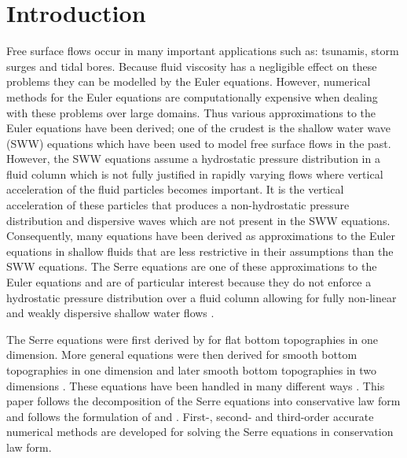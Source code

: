 \documentclass[SingleSpace,12pt,Proceedings]{Serre_ASCE}
\begin{document}
\section{Introduction} \label{intro}
Free surface flows occur in many important applications such as: tsunamis, storm surges and tidal bores. Because fluid viscosity has a negligible effect on these problems they can be modelled by the Euler equations. However, numerical methods for the Euler equations are computationally expensive when dealing with these problems over large domains. Thus various approximations to the Euler equations have been derived; one of the crudest is the shallow water wave (SWW) equations which have been used to model free surface flows in the past. However, the SWW equations assume a hydrostatic pressure distribution in a fluid column which is not fully justified in rapidly varying flows where vertical acceleration of the fluid particles becomes important. It is the vertical acceleration of these particles that produces a non-hydrostatic pressure distribution and dispersive waves which are not present in the SWW equations. Consequently, many equations have been derived as approximations to the Euler equations in shallow fluids that are less restrictive in their assumptions than the SWW equations. The Serre equations are one of these approximations to the Euler equations and are of particular interest because they do not enforce a hydrostatic pressure distribution over a fluid column allowing for fully non-linear and weakly dispersive shallow water flows \cite{Bonneton-Lannes-2009-16601}. 

The Serre equations were first derived by  for flat bottom topographies in one dimension. More general equations were then derived for smooth bottom topographies in one dimension \cite{Su-Gardener-1969-536} and later smooth bottom topographies in two dimensions \cite{Green-Naghdi-1976-237}. These equations have been handled in many different ways \cite{Dutykh-2014-315,Bonneton-etal-2011-1479,Antunes-do-Carmo-etal-1993-725,Chazel-etal-2011-105,Barthelemy-2006-51-1217,Barthelemy-2007-53-1423,Clamond-2011-315}. This paper follows the decomposition of the Serre equations into conservative law form \cite{Hank-etal-2010-2034,Guyenne-etal-2014-169,Zoppou-2014} and follows the formulation of  and . First-, second- and third-order accurate numerical methods are developed for solving the Serre equations in conservation law form. 

\end{document}
